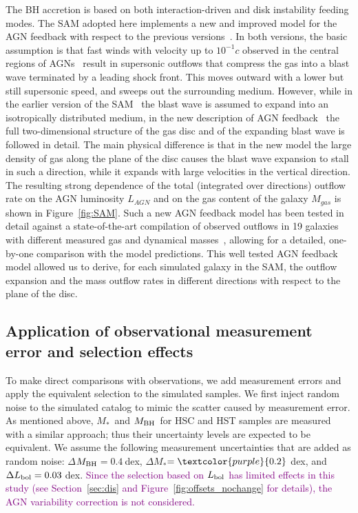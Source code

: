 \documentclass[twocolumn]{aastex631}
\newcommand{\red}[1]{\textcolor{purple}{#1}}
\def\smass{{$M_*$}}
\def\mbh{$M_{\rm BH}$}
\begin{document}
The BH accretion is based on both interaction-driven and disk instability feeding modes.
The SAM adopted here implements a new and improved  model for the AGN feedback with respect to the previous versions~\citep{Menci2008}. In both versions, the basic assumption is that fast winds with velocity up to $10^{-1}c$ observed in the central regions of AGNs~\citep{Chartas2002, Pounds2003}  result in  supersonic outflows that compress the gas into a blast wave terminated by a leading shock front. This  moves outward with a lower but still supersonic speed, and sweeps out the surrounding medium. However, while in the earlier version of the SAM~\citep{Menci2016} the blast wave is assumed to expand into an isotropically distributed medium, in the new description of AGN feedback~\citep{Menci2019} the full two-dimensional structure of the gas disc and of the expanding blast wave is followed in detail. The main physical difference is that in the new model the large density of gas along the plane of the disc causes the blast wave expansion to stall in such a direction, while it expands with large velocities in the vertical direction. The resulting strong dependence of the total (integrated over directions) outflow rate on the AGN luminosity $L_{AGN}$ and on the gas content of the galaxy $M_{gas}$ is shown in Figure~\ref{fig:SAM}. Such a new AGN feedback model has been tested in detail against a state-of-the-art compilation of observed outflows in 19 galaxies with different measured gas and dynamical masses~\citep{Fiore2017}, allowing for a detailed, one-by-one comparison with the model predictions. This well tested AGN feedback model allowed us to derive, for each simulated galaxy in the SAM,  the outflow expansion and the mass outflow rates in different directions with respect to the plane of the disc.



\subsection{Application of observational measurement error and selection effects}
To make direct comparisons with observations, we add measurement errors and apply the equivalent selection to the simulated samples. We first inject random noise to the simulated catalog to mimic the scatter caused by measurement error. As mentioned above, \smass\ and \mbh\ for HSC and HST samples are measured with a similar approach; thus their uncertainty levels are expected to be equivalent. We assume the following measurement uncertainties that are added as random noise: $\Delta$\mbh$ = 0.4~$dex, $\Delta$\smass$ = \red{0.2}~$dex, and $\Delta L_{\rm bol} = 0.03~$dex. \red{Since the selection based on $L_{\rm bol}$ has limited effects in this study (see Section~\ref{sec:dis} and Figure~\ref{fig:offsets_nochange} for details), the AGN variability correction is not considered.}
\end{document}
